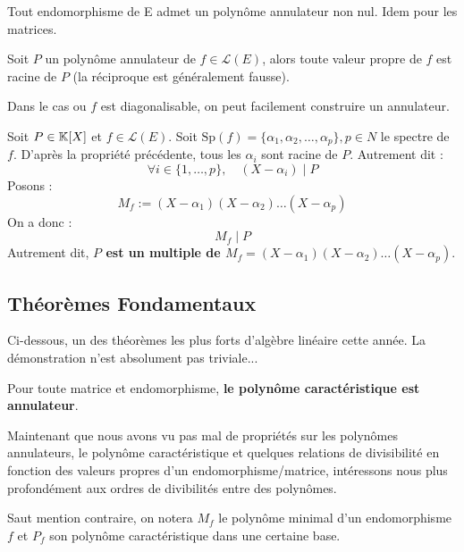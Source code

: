 \begin{proposition}
    Tout endomorphisme de E admet un polynôme annulateur non nul. 
    Idem pour les matrices. 
\end{proposition}

\begin{prop}
    Soit $P$ un polynôme annulateur de $f \in \mathcal{L}(E)$, alors toute valeur propre de $f$ est racine de $P$
    (la réciproque est généralement fausse). 
\end{prop}

\begin{remark}
    Dans le cas ou $f$ est diagonalisable, on peut facilement construire un annulateur. 
    
    Soit $P \in \mathbb{K}[X]$ et $f \in \mathcal{L}(E)$. Soit $\text{Sp}(f) = \{\alpha_1, \alpha_2, \dots, \alpha_p\}, p \in N$ 
    le spectre de $f$. D'après la propriété précédente, tous les $\alpha_i$ sont racine de $P$. 
    Autrement dit : 
        \[ \forall i \in \{1,\dots,p\}, \quad (X - \alpha_i) \; | \; P \]
    Posons :
        \[ M_f := (X - \alpha_1)(X - \alpha_2) \dots (X - \alpha_p)\]
    On a donc : 
        \[ M_f \; | \; P\]
    Autrement dit, \textbf{$P$ est un multiple de $M_f = (X - \alpha_1)(X - \alpha_2) \dots (X - \alpha_p)$}.
\end{remark}

\subsection{Théorèmes Fondamentaux}

Ci-dessous, un des théorèmes les plus forts d'algèbre linéaire cette année. 
La démonstration n'est absolument pas triviale...

\begin{theorem}
    Pour toute matrice et endomorphisme, \textbf{le polynôme caractéristique est annulateur}. 
\end{theorem}


Maintenant que nous avons vu pas mal de propriétés sur les polynômes annulateurs, le polynôme caractéristique et quelques
relations de divisibilité en fonction des valeurs propres d'un endomorphisme/matrice, intéressons nous plus profondément 
aux ordres de divibilités entre des polynômes. 

\vspace{0.3cm}

Saut mention contraire, on notera $M_f$ le polynôme minimal d'un endomorphisme $f$ et $P_f$ son polynôme caractéristique 
dans une certaine base. 

